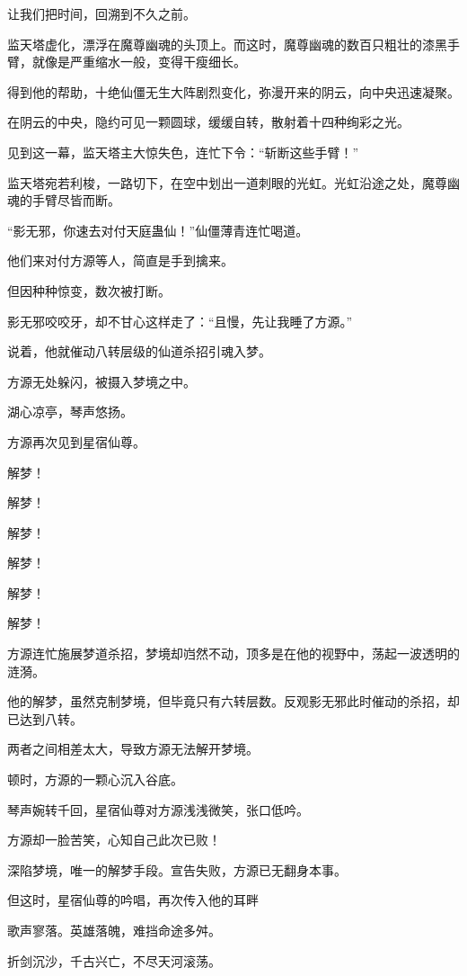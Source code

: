 
\begin{this_body}

让我们把时间，回溯到不久之前。

监天塔虚化，漂浮在魔尊幽魂的头顶上。而这时，魔尊幽魂的数百只粗壮的漆黑手臂，就像是严重缩水一般，变得干瘦细长。

得到他的帮助，十绝仙僵无生大阵剧烈变化，弥漫开来的阴云，向中央迅速凝聚。

在阴云的中央，隐约可见一颗圆球，缓缓自转，散射着十四种绚彩之光。

见到这一幕，监天塔主大惊失色，连忙下令：“斩断这些手臂！”

监天塔宛若利梭，一路切下，在空中划出一道刺眼的光虹。光虹沿途之处，魔尊幽魂的手臂尽皆而断。

“影无邪，你速去对付天庭蛊仙！”仙僵薄青连忙喝道。

他们来对付方源等人，简直是手到擒来。

但因种种惊变，数次被打断。

影无邪咬咬牙，却不甘心这样走了：“且慢，先让我睡了方源。”

说着，他就催动八转层级的仙道杀招引魂入梦。

方源无处躲闪，被摄入梦境之中。

湖心凉亭，琴声悠扬。

方源再次见到星宿仙尊。

解梦！

解梦！

解梦！

解梦！

解梦！

解梦！

方源连忙施展梦道杀招，梦境却岿然不动，顶多是在他的视野中，荡起一波透明的涟漪。

他的解梦，虽然克制梦境，但毕竟只有六转层数。反观影无邪此时催动的杀招，却已达到八转。

两者之间相差太大，导致方源无法解开梦境。

顿时，方源的一颗心沉入谷底。

琴声婉转千回，星宿仙尊对方源浅浅微笑，张口低吟。

方源却一脸苦笑，心知自己此次已败！

深陷梦境，唯一的解梦手段。宣告失败，方源已无翻身本事。

但这时，星宿仙尊的吟唱，再次传入他的耳畔

歌声寥落。英雄落魄，难挡命途多舛。

折剑沉沙，千古兴亡，不尽天河滚荡。


\end{this_body}
